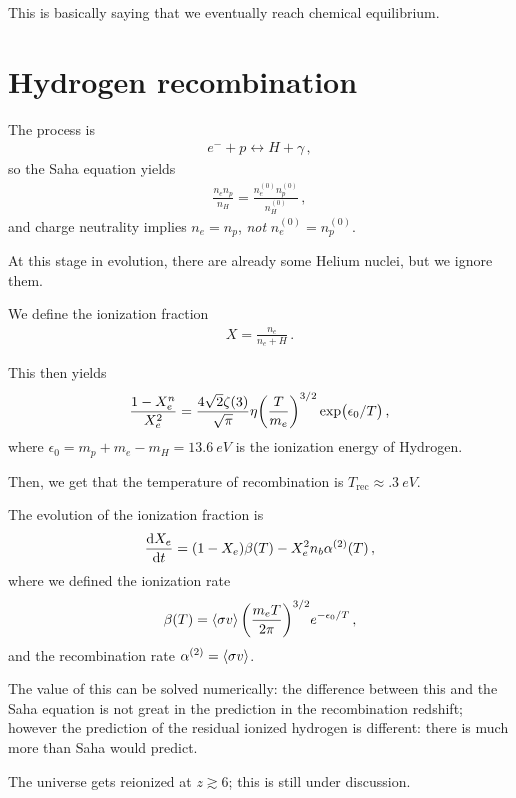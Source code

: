 \documentclass[main.tex]{subfiles}
\begin{document}
This is basically saying that we eventually reach chemical equilibrium. 

\section{Hydrogen recombination}

The process is 
%
\begin{align}
e^{-} + p \leftrightarrow H + \gamma 
\,,
\end{align}
%
so the Saha equation yields 
%
\begin{align}
\frac{n_e n_p}{n_H} = \frac{n_e^{(0)} n_p^{(0)}}{n_H^{(0)}}
\,,
\end{align}
%
and charge neutrality implies \(n_e = n_p\), \emph{not} \(n_e^{(0)} = n_p^{(0)}\). 

At this stage in evolution, there are already some Helium nuclei, but we ignore them. 

We define the ionization fraction 
%
\begin{align}
X = \frac{n_e}{n_e + H}
\,.
\end{align}

This then yields 
%
\begin{align}
\frac{1 - X_e^{n}}{X_e^{2}} = \frac{4 \sqrt{2} \zeta (3)}{\sqrt{\pi }} \eta \qty(\frac{T}{m_e})^{3/2} \exp(\epsilon_{0} / T)
\,,
\end{align}
%
where \(\epsilon_0 = m_p + m_e - m_H = \SI{13.6}{eV}\) is the ionization energy of Hydrogen. 

Then, we get that the temperature of recombination is \(T _{\text{rec}} \approx \SI{.3}{eV}\). 

The evolution of the ionization fraction is 
%
\begin{align}
\dv{X_{e}}{t} = (1-X_{e}) \beta (T) - X^2_{e} n_b \alpha^{(2)} (T)
\,,
\end{align}
%
where we defined the ionization rate 
%
\begin{align}
\beta (T) = \expval{\sigma v} \qty(\frac{m_e T}{2 \pi })^{3/2} e^{- \epsilon_0 /T}
\,,
\end{align}
%
and the recombination rate \(\alpha^{(2)} = \expval{\sigma v}\). 

The value of this can be solved numerically: the difference between this and the Saha equation is not great in the prediction in the recombination redshift; however the prediction of the residual ionized hydrogen is different: there is much more than Saha would predict. 

The universe gets reionized at \(z \gtrsim 6\); this is still under discussion. 
\end{document}
